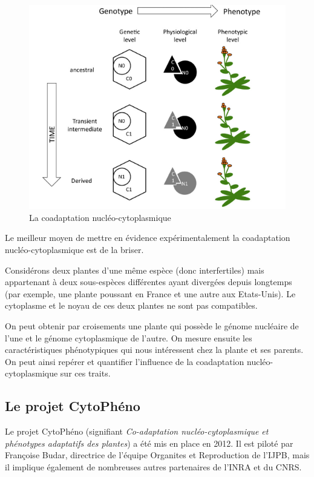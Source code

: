 \documentclass[a4paper]{article}
\begin{document}
\begin{figure}[!ht]
\centering
\includegraphics[scale=0.8]{Introduction/coadaptation.PNG}
\caption{La coadaptation nucléo-cytoplasmique \cite{marechal2012mitochondrial}}
\label{coadaptation}
\end{figure}

Le meilleur moyen de mettre en évidence expérimentalement la coadaptation nucléo-cytoplasmique est de la briser.

Considérons deux plantes d'une même espèce (donc interfertiles) mais appartenant à deux sous-espèces différentes ayant divergées depuis longtemps (par exemple, une plante poussant en France et une autre aux Etats-Unis). Le cytoplasme et le noyau de ces deux plantes ne sont pas compatibles. 

On peut obtenir par croisements une plante qui possède le génome nucléaire de l'une et le génome cytoplasmique de l'autre. On mesure ensuite les caractéristiques phénotypiques qui nous intéressent chez la plante et ses parents. On peut ainsi repérer et quantifier l'influence de la coadaptation nucléo-cytoplasmique sur ces traits. 

\subsection{Le projet CytoPhéno}

Le projet CytoPhéno (signifiant \textit{Co-adaptation nucléo-cytoplasmique et phénotypes adaptatifs des plantes}) a été mis en place en 2012. Il est piloté par Françoise Budar, directrice de l'équipe Organites et Reproduction de l'IJPB, mais il implique également de nombreuses autres partenaires de l'INRA et du CNRS. 
\end{document}
